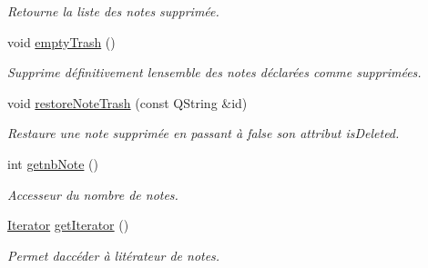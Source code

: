 \begin{DoxyCompactItemize}
\begin{DoxyCompactList}\small\item\em Retourne la liste des notes supprimée. \end{DoxyCompactList}\item 
void \hyperlink{class_notes_manager_a84e962ad7fa999cbb687fb43c1b3bab4}{empty\+Trash} ()
\begin{DoxyCompactList}\small\item\em Supprime définitivement l\textquotesingle{}ensemble des notes déclarées comme supprimées. \end{DoxyCompactList}\item 
void \hyperlink{class_notes_manager_abc6587a5d3986ae674e5dd4b9044f348}{restore\+Note\+Trash} (const Q\+String \&id)
\begin{DoxyCompactList}\small\item\em Restaure une note supprimée en passant à false son attribut is\+Deleted. \end{DoxyCompactList}\item 
\mbox{\label{class_notes_manager_a9cab39a524fd23c6523f895e81f75028}} 
int \hyperlink{class_notes_manager_a9cab39a524fd23c6523f895e81f75028}{getnb\+Note} ()
\begin{DoxyCompactList}\small\item\em Accesseur du nombre de notes. \end{DoxyCompactList}\item 
\mbox{\label{class_notes_manager_a4907351a20cc85b1fe0327ac1b15c7da}} 
\hyperlink{class_notes_manager_1_1_iterator}{Iterator} \hyperlink{class_notes_manager_a4907351a20cc85b1fe0327ac1b15c7da}{get\+Iterator} ()
\begin{DoxyCompactList}\small\item\em Permet d\textquotesingle{}accéder à l\textquotesingle{}itérateur de notes. \end{DoxyCompactList}\end{DoxyCompactItemize}
